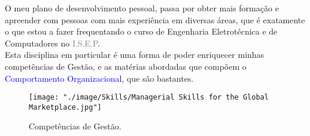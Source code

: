 O meu plano de desenvolvimento pessoal, passa por obter mais formação e apreender com pessoas com mais experiência em diversas áreas, que é exatamente o que estou a fazer frequentando o curso de Engenharia Eletrotécnica e de Computadores no \textcolor{gray}{I.S.E.P}.\\
Esta disciplina em particular é uma forma de poder enriquecer minhas competências de Gestão, e as matérias abordadas que compõem o \textcolor{blue}{Comportamento Organizacional}, que são bastantes.
\begin{figure}[H]
	\begin{minipage}{\linewidth}
		\centering
		\texttt{[image: "./image/Skills/Managerial Skills for the Global Marketplace.jpg"]}
	\end{minipage}
	\caption{Competências de Gestão. \cite{book_6}}
\end{figure}






\begin{comment}
a) Realizar um diagnóstico de competências pessoais;\\
b) Definir objetivos de carreira;\\
c) Definir as competências que considere que no futuro lhe permitirão atingir os referidos objetivos;\\
d) Definir um plano de desenvolvimento para as competências anteriormente selecionadas.
\end{comment}